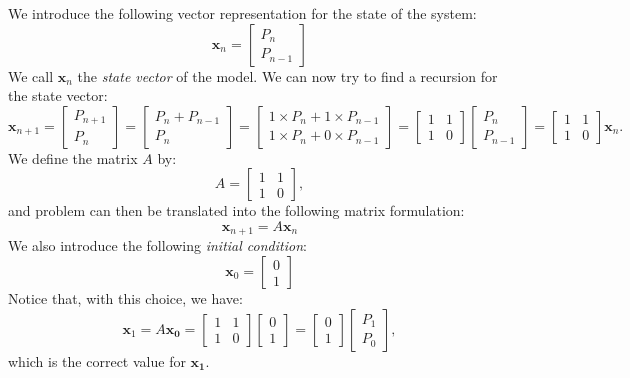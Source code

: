 \documentclass[12pt]{article}
\begin{document}
We introduce the following vector representation for the state of the system:
\[
\mathbf{x}_n=
\begin{bmatrix}P_{n}\\P_{n-1}\end{bmatrix}
\]
We call $\mathbf{x}_n$ the \emph{state vector} of the model. We can now try to find a recursion for the state vector:
\[
\mathbf{x}_{n+1}=
\begin{bmatrix}P_{n+1}\\P_{n}\end{bmatrix}=
\begin{bmatrix}P_{n}+P_{n-1}\\P_{n}\end{bmatrix}=
\begin{bmatrix}1\times P_{n}+1\times P_{n-1}\\1\times P_{n}+0\times P_{n-1}\end{bmatrix}=
\begin{bmatrix}1&1\\1&0\end{bmatrix} \begin{bmatrix}P_{n}\\P_{n-1}\end{bmatrix}=
\begin{bmatrix}1&1\\1&0\end{bmatrix} \mathbf{x}_n.
\]
We define the matrix $A$ by:
\[
A=\begin{bmatrix}1&1\\1&0\end{bmatrix},
\]
and problem can then be translated into the following matrix formulation:
\[
\mathbf{x}_{n+1}=A\mathbf{x}_n
\]
We also introduce the following \emph{initial condition}:
\[
\mathbf{x}_0=\begin{bmatrix}0\\1\end{bmatrix}
\]
Notice that, with this choice, we have:
\[
\mathbf{x}_1=A\mathbf{x_0}=\begin{bmatrix}1&1\\1&0\end{bmatrix}\begin{bmatrix}0\\1\end{bmatrix}=
\begin{bmatrix}0\\1\end{bmatrix}\begin{bmatrix}P_1\\P_0\end{bmatrix},
\]
which is the correct value for $\mathbf{x_1}$.
\end{document}
